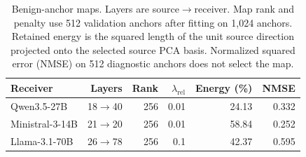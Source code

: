 \begin{table}[t]
\centering\scriptsize\setlength{\tabcolsep}{3pt}
\begin{tabular}{lrrrrr}
\toprule
Receiver & Layers & Rank & $\lambda_{\mathrm{rel}}$ & Energy (\%) & NMSE \\
\midrule
Qwen3.5-27B & 18$\to$40 & 256 & 0.01 & 24.13 & 0.332 \\
Ministral-3-14B & 21$\to$20 & 256 & 0.01 & 58.84 & 0.252 \\
Llama-3.1-70B & 26$\to$78 & 256 & 0.1 & 42.37 & 0.595 \\
\bottomrule
\end{tabular}
\caption{Benign-anchor maps. Layers are source$\to$receiver. Map rank and penalty use 512 validation anchors after fitting on 1,024 anchors. Retained energy is the squared length of the unit source direction projected onto the selected source PCA basis. Normalized squared error (NMSE) on 512 diagnostic anchors does not select the map.}
\label{tab:current-maps}
\end{table}
